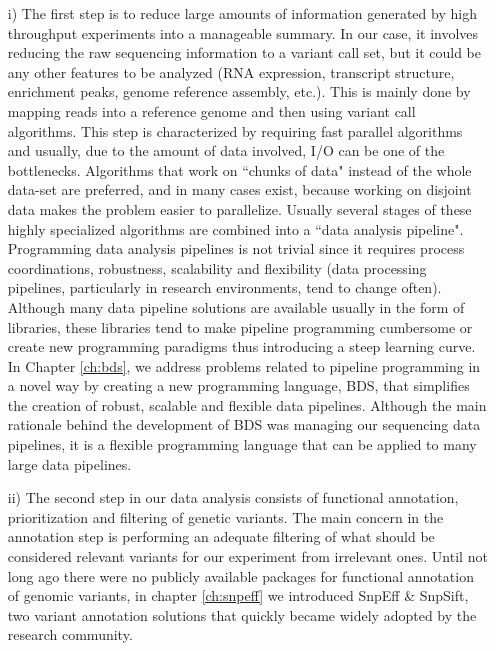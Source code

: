 \begin{itemize}
\item[i)] The first step is to reduce large amounts of information generated by high throughput experiments into a manageable summary. In our case, it involves reducing the raw sequencing information to a variant call set, but it could be any other features to be analyzed (RNA expression, transcript structure, enrichment peaks, genome reference assembly, etc.). This is mainly done by mapping reads into a reference genome and then using variant call algorithms. This step is characterized by requiring fast parallel algorithms and usually, due to the amount of data involved, I/O can be one of the bottlenecks. Algorithms that work on ``chunks of data" instead of the whole data-set are preferred, and in many cases exist, because working on disjoint data makes the problem easier to parallelize. Usually several stages of these highly specialized algorithms are combined into a ``data analysis pipeline". Programming data analysis pipelines is not trivial since it requires process coordinations, robustness, scalability and flexibility (data processing pipelines, particularly in research environments, tend to change often). Although many data pipeline solutions are available usually in the form of libraries, these libraries tend to make pipeline programming cumbersome or create new programming paradigms thus introducing a steep learning curve. In Chapter \ref{ch:bds}, we address problems related to pipeline programming in a novel way by creating a new programming language, BDS, that simplifies the creation of robust, scalable and flexible data pipelines. Although the main rationale behind the development of BDS was managing our sequencing data pipelines, it is a flexible programming language that can be applied to many large data pipelines.

\item[ii)] The second step in our data analysis consists of functional annotation, prioritization and filtering of genetic variants. The main concern in the annotation step is performing an adequate filtering of what should be considered relevant variants for our experiment from irrelevant ones. Until not long ago there were no publicly available packages for functional annotation of genomic variants, in chapter \ref{ch:snpeff} we introduced SnpEff \& SnpSift, two variant annotation solutions that quickly became widely adopted by the research community. 


\end{itemize}
